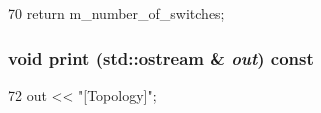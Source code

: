 \begin{DoxyCode}
70 { return m_number_of_switches; }
\end{DoxyCode}
\hypertarget{classTopology_ac55fe386a101fbae38c716067c9966a0}{
\subsubsection[{print}]{\setlength{\rightskip}{0pt plus 5cm}void print (std::ostream \& {\em out}) const}}
\label{classTopology_ac55fe386a101fbae38c716067c9966a0}



\begin{DoxyCode}
72 { out << "[Topology]"; }
\end{DoxyCode}


